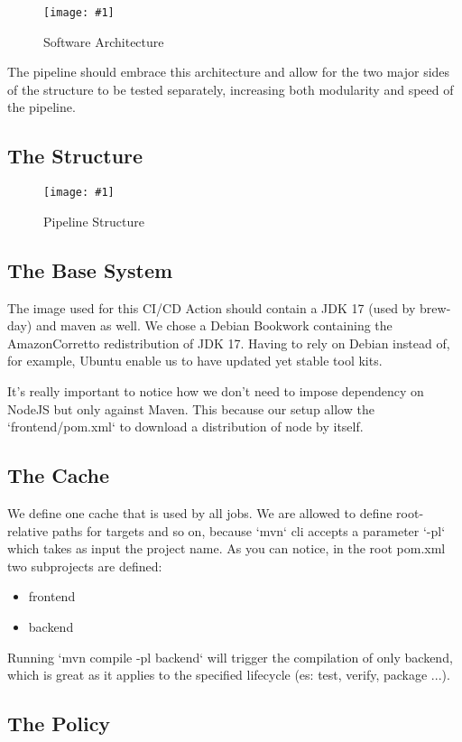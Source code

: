 \documentclass[a4paper,10pt]{scrartcl}
\newcommand{\putimage}[3] {
	\begin{figure}[H]
	    \centering
	    \texttt{[image: \#1]}
	    \caption{#2}\label{#3}
	\end{figure}
}
\begin{document}
\putimage{Arch.png}{Software Architecture}{fig:arch}

The pipeline should embrace this architecture and allow for the two major sides of the structure to be tested separately, increasing both modularity and speed of the pipeline.

\subsection{The Structure}

\putimage{Pipeline.png}{Pipeline Structure}{fig:arch}

\subsection{The Base System}

The image used for this CI/CD Action should contain a JDK 17 (used by brew-day) and maven as well. We chose a Debian Bookwork containing the AmazonCorretto redistribution of JDK 17. Having to rely on Debian instead of, for example, Ubuntu enable us to have updated yet stable tool kits.

It's really important to notice how we don't need to impose dependency on NodeJS but only against Maven. This because our setup allow the `frontend/pom.xml` to download a distribution of node by itself.

\subsection{The Cache}

We define one cache that is used by all jobs. We are allowed to define root-relative paths for targets and so on, because `mvn` cli accepts a parameter `-pl` which takes as input the project name. As you can notice, in the root pom.xml two subprojects are defined:

\begin{itemize}
    \item frontend
    \item backend
\end{itemize}

Running `mvn compile -pl backend` will trigger the compilation of only backend, which is great as it applies to the specified lifecycle (es: test, verify, package ...).

\subsection{The Policy}
\end{document}
